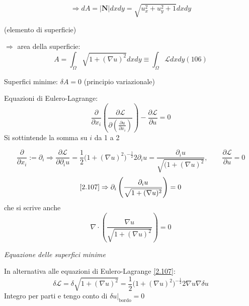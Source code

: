 \documentclass[a4paper,11pt]{report}
\newcommand{\vect}[1]{\boldsymbol{#1}}
\begin{document}
\[
\Rightarrow dA = |\vect{N}|dxdy=\sqrt{u_x^2 + u_y^2 +1}dxdy 
\]
\centerline{(elemento di superficie)}

$\Rightarrow$ area della superficie:
\begin{equation}
A=\int_{\Omega} \sqrt{1+(\nabla u)^2} dxdy\equiv \int_{\Omega} \mathcal{L}dxdy (106)
\end{equation}

Superfici minime: $\delta A=0$ (principio variazionale)

Equazioni di Eulero-Lagrange:
\begin{equation}
\frac{\partial}{\partial x_i}\left( \frac{\partial \mathcal{L}}{\partial (\frac{\partial u}{\partial x_i})} \right)-\frac{\partial \mathcal{L}}{\partial u}=0
\label{2.107}
\end{equation}
Si sottintende la somma su $i$ da 1 a 2

\[
\frac{\partial}{\partial x_i}:=\partial_i \Rightarrow \frac{\partial\mathcal{L}}{\partial \partial_i u} = \frac{1}{2} \big(1 +(\nabla u)^2\big)^{-\frac{1}{2}} 2\partial_i u=\frac{\partial_i u}{\sqrt{(1+(\nabla u)^2}}, \qquad \frac{\partial \mathcal{L}}{\partial u}=0 
\]
\[
\eqref{2.107}\Rightarrow \partial_i \left( \frac{\partial_i u}{\sqrt{1+(\nabla u)^2}}\right)=0
\]
che si scrive anche
\begin{equation}
\nabla \cdot \left( \frac{\nabla u}{\sqrt{1+(\nabla u)^2}}\right)=0
\label{2.108}
\end{equation}
\centerline{\emph{Equazione delle superfici minime}}

In alternativa alle equazioni di Eulero-Lagrange \eqref{2.107}:
\[
\delta\mathcal{L}=\delta\sqrt{1+(\nabla u)^2}=\frac{1}{2}\big(1+(\nabla u)^2\big)^{-\frac{1}{2}}2\nabla u \nabla \delta u
\]
Integro per parti e tengo conto di $\delta u\big|_\text{bordo}=0$
\end{document}
